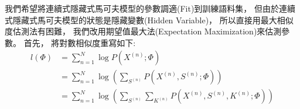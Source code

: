     我們希望將連續式隱藏式馬可夫模型的參數調適(Fit)到訓練語料集，
    但由於連續式隱藏式馬可夫模型的狀態是隱藏變數(Hidden Variable)，
    所以直接用最大相似度估測法有困難，
    我們改用期望值最大法(Expectation Maximization)來估測參數。
    首先，
    將對數相似度重寫如下:
    \begin{equation}
      \begin{split}
	l(\Phi) 
	&= \sum_{n=1}^N \log P(X^{(n)} ; \Phi) \\
	&= \sum_{n=1}^N \log \left( \sum_{S^{(n)}} P(X^{(n)}, S^{(n)}; \Phi) \right) \\
	&= \sum_{n=1}^N \log \left( \sum_{S^{(n)}} \sum_{K^{(n)}} P(X^{(n)}, S^{(n)}, K^{(n)}; \Phi) \right) \\
      \end{split}
    \end{equation}

